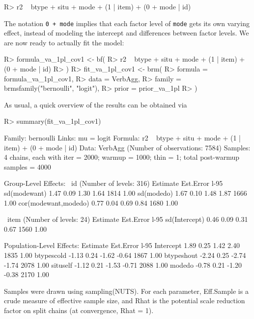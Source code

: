 \documentclass[jss]{jss}
\begin{document}
\begin{CodeChunk}

\begin{CodeInput}
R> r2 ~ btype + situ + mode + (1 | item) + (0 + mode | id)
\end{CodeInput}
\end{CodeChunk}

The notation \texttt{0\ +\ mode} implies that each factor level of
\texttt{mode} gets its own varying effect, instead of modeling the
intercept and differences between factor levels. We are now ready to
actually fit the model:

\begin{CodeChunk}

\begin{CodeInput}
R> formula_va_1pl_cov1 <- bf(
R>   r2 ~ btype + situ + mode + (1 | item) + (0 + mode | id)
R> )
R> fit_va_1pl_cov1 <- brm(
R>   formula = formula_va_1pl_cov1,
R>   data = VerbAgg, 
R>   family = brmsfamily("bernoulli", "logit"),
R>   prior = prior_va_1pl
R> )
\end{CodeInput}
\end{CodeChunk}

As usual, a quick overview of the results can be obtained via

\begin{CodeChunk}

\begin{CodeInput}
R> summary(fit_va_1pl_cov1)
\end{CodeInput}

\begin{CodeOutput}
 Family: bernoulli 
  Links: mu = logit 
Formula: r2 ~ btype + situ + mode + (1 | item) + (0 + mode | id) 
   Data: VerbAgg (Number of observations: 7584) 
Samples: 4 chains, each with iter = 2000; warmup = 1000; thin = 1;
         total post-warmup samples = 4000

Group-Level Effects: 
~id (Number of levels: 316) 
                     Estimate Est.Error l-95%
sd(modewant)             1.47      0.09     1.30     1.64       1814 1.00
sd(modedo)               1.67      0.10     1.48     1.87       1666 1.00
cor(modewant,modedo)     0.77      0.04     0.69     0.84       1680 1.00

~item (Number of levels: 24) 
              Estimate Est.Error l-95%
sd(Intercept)     0.46      0.09     0.31     0.67       1560 1.00

Population-Level Effects: 
           Estimate Est.Error l-95%
Intercept      1.89      0.25     1.42     2.40       1835 1.00
btypescold    -1.13      0.24    -1.62    -0.64       1867 1.00
btypeshout    -2.24      0.25    -2.74    -1.74       2078 1.00
situself      -1.12      0.21    -1.53    -0.71       2088 1.00
modedo        -0.78      0.21    -1.20    -0.38       2170 1.00

Samples were drawn using sampling(NUTS). For each parameter, Eff.Sample 
is a crude measure of effective sample size, and Rhat is the potential 
scale reduction factor on split chains (at convergence, Rhat = 1).
\end{CodeOutput}
\end{CodeChunk}
\end{document}
